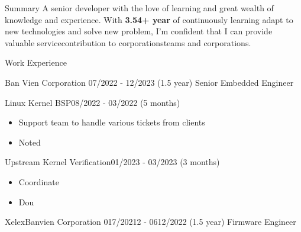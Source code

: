 \documentclass{resume} %
\begin{document}
\begin{rSection}{Summary}
A senior developer with the love of learning and great wealth of knowledge and experience. With \textbf{3.54+ year} of continuously learning adapt to new technologies and solve new problem, I'm confident that I can provide valuable servicecontribution to corporationsteams and corporations.
\end{rSection}


\begin{rSection}{Work Experience}
    \begin{rCompanySubsection}
        {Ban Vien Corporation} 
        {07/2022 - 12/2023 (1.5 year)} 
        {Senior Embedded Engineer} 
        {}
        \begin{rProjectSubsubsection}{Linux Kernel BSP}{08/2022 - 03/2022 (5 months)}
            \begin{itemize}
                \setlength{\itemindent}{1.25em}
                \item Support team to handle various tickets from clients
                \item Noted
            \end{itemize}
        \end{rProjectSubsubsection}
        \begin{rProjectSubsubsection}{Upstream Kernel Verification}{01/2023 - 03/2023 (3 months)}
            \begin{itemize}
                \setlength{\itemindent}{1.25em}
                \item Coordinate
                \item Dou
        \end{itemize}
        \end{rProjectSubsubsection}
    \end{rCompanySubsection}
\begin{rCompanySubsection}
    {XelexBanvien Corporation} 
    {017/20212 - 0612/2022 (1.5 year)} 
    {Firmware Engineer}
    {}


\end{rCompanySubsection}
\end{rSection}
\end{document}
